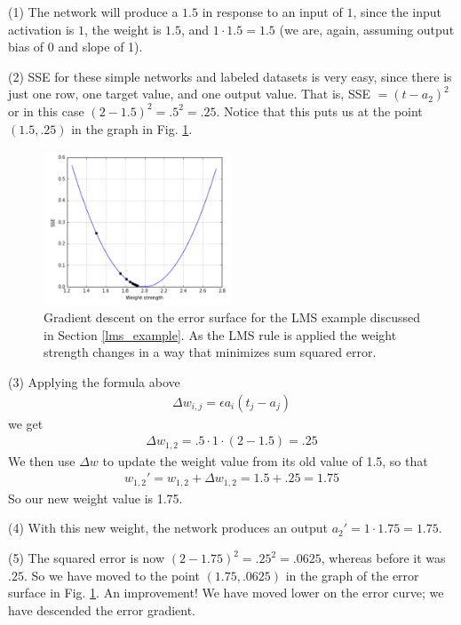 (1) The network will produce a $1.5$ in response to an input of $1$, since the input activation is $1$, the weight is $1.5$, and $1 \cdot 1.5 = 1.5$ (we are, again, assuming output bias of 0 and slope of 1). 

(2) SSE for these simple networks and labeled datasets is very easy, since there is just one row, one target value, and one output value. That is,  SSE $= (t - a_2)^2$ or in this case $(2-1.5)^2 = .5^2 = .25$. Notice that this puts us at the point $(1.5,.25)$ in the graph in Fig. \ref{error_lms}.

\begin{figure}[h]
\centering
\includegraphics[width=0.5\textwidth]{images/error_lms.png}
\caption[Jeff Yoshimi.]{Gradient descent on the error surface for the LMS example discussed in Section \ref{lms_example}. As the LMS rule is applied the weight strength changes in a way that minimizes sum squared error.}
\label{error_lms}
\end{figure}

(3) Applying the formula above
\begin{eqnarray*}
\Delta w_{i,j}  =  \epsilon a_i (t_j - a_j)
\end{eqnarray*}
we get
\begin{eqnarray*}
\Delta w_{1,2}  =  .5 \cdot 1 \cdot (2- 1.5) = .25
\end{eqnarray*}
We then use $\Delta w$ to update the weight value from its old value of 1.5, so that
\begin{eqnarray*}
w_{1,2}' = w_{1,2} + \Delta w_{1,2}  = 1.5 +.25  = 1.75
\end{eqnarray*}
So our new weight value is 1.75. 

(4) With this new weight, the network produces an output  $a_2' = 1 \cdot 1.75 = 1.75$. 

(5) The squared error is now $(2-1.75)^2=.25^2=.0625$, whereas before it was $.25$. So we have moved to the point $(1.75,.0625)$ in the graph  of the error surface in Fig. \ref{error_lms}. An improvement!  We have moved lower on the error curve; we have descended the error gradient.

